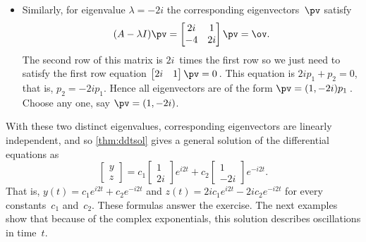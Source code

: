 \begin{example}
\begin{solution}
\begin{itemize}
\item Similarly, for eigenvalue \(\lambda=-2i\) the corresponding eigenvectors~\(\pv\) satisfy
\begin{equation*}
(A-\lambda I)\pv=\begin{bmatrix} 2i&1\\-4&2i \end{bmatrix}\pv
=\ov.
\end{equation*}
The second row of this matrix is \(2i\)~times the first row so we just need to satisfy the first row equation \(\begin{bmatrix} 2i&1 \end{bmatrix}\pv=0\)\,.
This equation is \(2ip_1+p_2=0\), that is, \(p_2=-2ip_1\).
Hence all eigenvectors are of the form \(\pv=(1,-2i)p_1\)\,.
Choose any one, say \(\pv=(1,-2i)\).
\end{itemize}
With these two distinct eigenvalues, corresponding eigenvectors are linearly independent, and so \autoref{thm:ddtsol} gives a general solution of the differential equations as
\begin{equation*}
\begin{bmatrix} y\\z \end{bmatrix}
=c_1\begin{bmatrix} 1\\2i \end{bmatrix}e^{i2t}
+c_2\begin{bmatrix} 1\\-2i \end{bmatrix}e^{-i2t}.
\end{equation*}
That is, \(y(t)=c_1e^{i2t}+c_2e^{-i2t}\) and \(z(t)=2ic_1e^{i2t}-2ic_2e^{-i2t}\) for every constants~\(c_1\) and~\(c_2\).
These formulas answer the exercise.
The next examples show that because of the complex exponentials, this solution describes oscillations in time~\(t\).
\end{solution}
\end{example}




